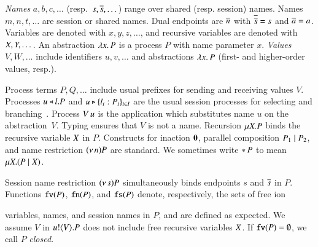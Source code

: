 \documentclass[preprint,11pt]{elsarticle}
\begin{document}
{%
\emph{Names} $a,b,c, \dots$ (resp.~$s, \overline{s}, \dots$) 
range over shared (resp. session) names. 
Names $m, n, t, \dots$ are session or shared names.
Dual endpoints are $\overline{n}$ with
$\overline{\overline{s}} = s$ and $\overline{a} = a$.
Variables are denoted with $x, y, z, \dots$, 
and recursive variables are denoted with $X, Y, \dots$.
An abstraction %
$\lambda x.\,P$ is a process $P$ with name parameter $x$.
\emph{Values} $V,W, \ldots$ include 
identifiers $u, v, \ldots$ %
and 
abstractions $\lambda x.\,P$ (first- and higher-order values, resp.). 


Process terms $P, Q, \ldots$ 
include usual %
prefixes for sending and receiving values $V$.
Processes $u \triangleleft l . P$ and $u \triangleright \{l_i: P_i\}_{i \in I}$ are the
usual session processes for selecting and branching~\cite{honda.vasconcelos.kubo:language-primitives}.
Process 
$V\, {u}$ 
is the application
which substitutes name $u$ on the abstraction~$V$. 
Typing  ensures that $V$ is not a name.
Recursion   $\mu X. P$ binds the recursive variable $X$ in   $P$.
Constructs for 
inaction $\mathbf{0}$,  parallel composition $P_1 \;|\; P_2$, and 
name restriction $(\nu\, n) P$ are standard.
We sometimes write $\ast\,{} P$ to mean $\mu X. (P \;|\; X)$. 

Session name restriction $(\nu\, s) P$ simultaneously binds endpoints $s$ and $\overline{s}$ in $P$.
Functions $\mathtt{fv}(P)$, $\mathtt{fn}(P)$, and $\mathtt{fs}(P)$ denote, respectively, the sets of free 
ion}
variables, names, and session names in $P$, and are defined as expected.
We assume $V$ in $u ! \langle V \rangle .{P}$ does not include free recursive 
variables $X$.
If $\mathtt{fv}(P) = \emptyset$, we call $P$ {\em closed}.
\end{document}
